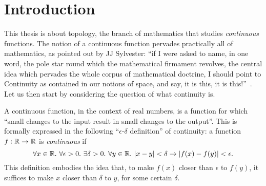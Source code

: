 \chapter{Introduction}\label{chap:intro}

This thesis is about topology, the branch of mathematics that studies \emph{continuous}
functions. The notion of a continuous function pervades practically all of mathematics, as
pointed out by JJ Sylvester: ``if I were asked to name, in one word, the pole star round
which the mathematical firmament revolves, the central idea which pervades the whole
corpus of mathematical doctrine, I should point to Continuity as contained in our notions
of space, and say, it is this, it is this!''~\cite[pg. 27]{armstrong-topology}. Let us
then start by considering the question of what continuity is.

A continuous function, in the context of real numbers, is a function for which
``small changes to the input result in small changes to the output''. This is
formally expressed in the following ``$\epsilon$-$\delta$ definition'' of continuity: a
function $f : \mathbb{R}{} \rightarrow \mathbb{R}{}$ is
\emph{continuous} if
\begin{equation*}\label{eq:cont-0}
  \forall x \in \mathbb{R}{}.~ \forall \epsilon > 0.~ \exists \delta > 0.~ \forall y \in \mathbb{R}{}.~
    | x - y | < \delta \rightarrow | f(x) - f(y) | < \epsilon.
\end{equation*}
This definition embodies the idea that, to make $f(x)$ closer than $\epsilon$ to
$f(y)$, it suffices to make $x$ closer than $\delta$ to $y$, for some certain $\delta$.

